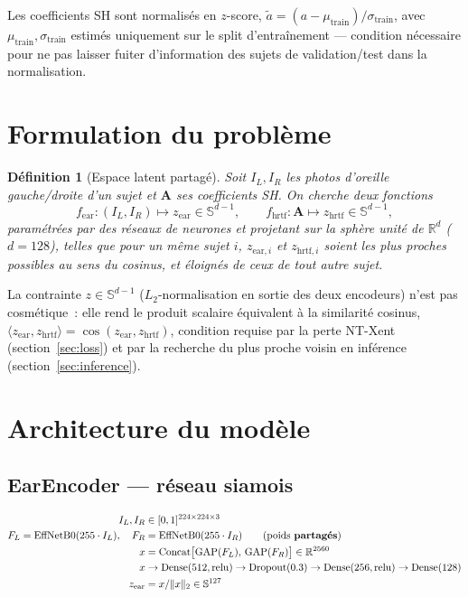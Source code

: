 \documentclass[12pt, a4paper]{article}
\newtheorem{definition}{Définition}
\begin{document}
Les coefficients SH sont normalisés en $z$-score,
$\tilde{a} = (a-\mu_{\mathrm{train}})/\sigma_{\mathrm{train}}$, avec
$\mu_{\mathrm{train}}, \sigma_{\mathrm{train}}$ estimés uniquement sur le
split d'entraînement — condition nécessaire pour ne pas laisser fuiter
d'information des sujets de validation/test dans la normalisation.

\section{Formulation du problème}

\begin{definition}[Espace latent partagé]
Soit $I_L, I_R$ les photos d'oreille gauche/droite d'un sujet et
$\mathbf{A}$ ses coefficients SH. On cherche deux fonctions
$$
f_{\mathrm{ear}} : (I_L,I_R) \longmapsto z_{\mathrm{ear}} \in \mathbb{S}^{d-1},
\qquad
f_{\mathrm{hrtf}} : \mathbf{A} \longmapsto z_{\mathrm{hrtf}} \in \mathbb{S}^{d-1},
$$
paramétrées par des réseaux de neurones et projetant sur la sphère unité de
$\mathbb{R}^d$ ($d=128$), telles que pour un même sujet $i$, $z_{\mathrm{ear},i}$
et $z_{\mathrm{hrtf},i}$ soient les plus proches possibles au sens du
cosinus, et éloignés de ceux de tout autre sujet.
\end{definition}

La contrainte $z\in\mathbb{S}^{d-1}$ ($L_2$-normalisation en sortie des deux
encodeurs) n'est pas cosmétique~: elle rend le produit scalaire équivalent
à la similarité cosinus,
$\langle z_{\mathrm{ear}}, z_{\mathrm{hrtf}}\rangle = \cos(z_{\mathrm{ear}}, z_{\mathrm{hrtf}})$,
condition requise par la perte NT-Xent (section~\ref{sec:loss}) et par la
recherche du plus proche voisin en inférence (section~\ref{sec:inference}).

\section{Architecture du modèle}

\subsection{EarEncoder — réseau siamois}
\label{sec:ear-encoder}

\begin{equation}
\begin{aligned}
    I_L,I_R &\in [0,1]^{224\times224\times3} \\
    F_L = \mathrm{EffNetB0}(255\cdot I_L), \quad F_R &= \mathrm{EffNetB0}(255\cdot I_R)
    \qquad \text{(poids \textbf{partagés})} \\
    x &= \mathrm{Concat}\bigl[\mathrm{GAP}(F_L),\,\mathrm{GAP}(F_R)\bigr] \in \mathbb{R}^{2560}\\
    x &\to \mathrm{Dense}(512,\mathrm{relu}) \to \mathrm{Dropout}(0.3)
        \to \mathrm{Dense}(256,\mathrm{relu}) \to \mathrm{Dense}(128) \\
    z_{\mathrm{ear}} &= x / \lVert x \rVert_2 \in \mathbb{S}^{127}
\end{aligned}
\end{equation}
\end{document}

